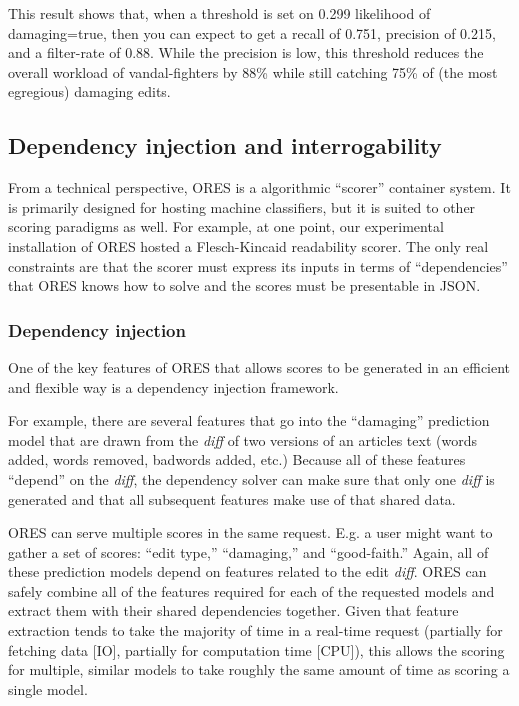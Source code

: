 This result shows that, when a threshold is set on 0.299 likelihood of damaging=true, then you can expect to get a recall of 0.751, precision of 0.215, and a filter-rate of 0.88.  While the precision is low, this threshold reduces the overall workload of vandal-fighters by 88\% while still catching 75\% of (the most egregious) damaging edits.

\subsection{Dependency injection and interrogability}
From a technical perspective, ORES is a algorithmic ``scorer'' container system.  It is primarily designed for hosting machine classifiers, but it is suited to other scoring paradigms as well.  For example, at one point, our experimental installation of ORES hosted a Flesch-Kincaid readability scorer.  The only real constraints are that the scorer must express its inputs in terms of ``dependencies'' that ORES knows how to solve and the scores must be presentable in JSON.

\subsubsection{Dependency injection}
One of the key features of ORES that allows scores to be generated in an efficient and flexible way is a dependency injection framework.

For example, there are several features that go into the ``damaging'' prediction model that are drawn from the \emph{diff} of two versions of an articles text (words added, words removed, badwords added, etc.)  Because all of these features ``depend'' on the \emph{diff}, the dependency solver can make sure that only one \emph{diff} is generated and that all subsequent features make use of that shared data.

ORES can serve multiple scores in the same request.  E.g. a user might want to gather a set of scores: ``edit type,'' ``damaging,'' and ``good-faith.''  Again, all of these prediction models depend on features related to the edit \emph{diff}.  ORES can safely combine all of the features required for each of the requested models and extract them with their shared dependencies together.  Given that feature extraction tends to take the majority of time in a real-time request (partially for fetching data [IO], partially for computation time [CPU]), this allows the scoring for multiple, similar models to take roughly the same amount of time as scoring a single model.

